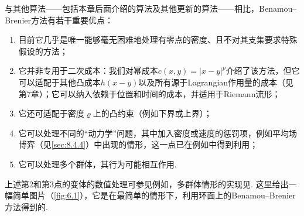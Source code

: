 与其他算法——包括本章后面介绍的算法及其他更新的算法——相比，Benamou--Brenier方法有若干重要优点：
\begin{enumerate}
\item 目前它几乎是唯一能够毫无困难地处理有零点的密度、且不对其支集要求特殊假设的方法；
\item 它并非专用于二次成本：我们对幂成本$c(x,y)=|x-y|^p$介绍了该方法，但它可以适配于其他凸成本$h(x-y)$以及所有源于Lagrangian作用量的成本（见\cite{b293}第7章）；它可以纳入依赖于位置和时间的成本，并适用于Riemann流形；
\item 它还可适配于密度$\varrho$上的凸约束（例如下界或上界）；
\item 它可以处理不同的“动力学”问题，其中加入密度或速度的惩罚项，例如平均场博弈（见\autoref{sec:8.4.4}）中出现的情形，这一点已在例如\cite{b35}中得到利用；
\item 它可以处理多个群体，其行为可能相互作用.
\end{enumerate}
上述第2和第3点的变体的数值处理可参见例如\cite{b96,b248}，多群体情形的实现见\cite{b37}. \label{idx:i148-p225}
这里给出一幅简单图片（\autoref{fig:6.1}），它是在最简单的情形下，利用环面上的Benamou--Brenier方法得到的.
